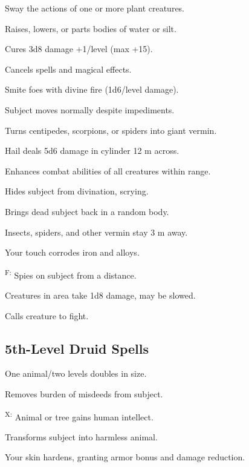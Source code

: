  Sway the actions of one or more plant creatures.

 Raises, lowers, or parts bodies of water or silt.

 Cures 3d8 damage +1/level (max +15).

 Cancels spells and magical effects.

 Smite foes with divine fire (1d6/level damage).

 Subject moves normally despite impediments.

 Turns centipedes, scorpions, or spiders into giant vermin.

 Hail deals 5d6 damage in cylinder 12 m across.

 Enhances combat abilities of all creatures within range.

 Hides subject from divination, scrying.

 Brings dead subject back in a random body.

 Insects, spiders, and other vermin stay 3 m away.

 Your touch corrodes iron and alloys.

\textsuperscript{F:} Spies on subject from a distance.

 Creatures in area take 1d8 damage, may be slowed.

 Calls creature to fight.



\subsection{5th-Level Druid Spells}

 One animal/two levels doubles in size.

 Removes burden of misdeeds from subject.

\textsuperscript{X:} Animal or tree gains human intellect.

 Transforms subject into harmless animal.

 Your skin hardens, granting armor bonus and damage reduction.

